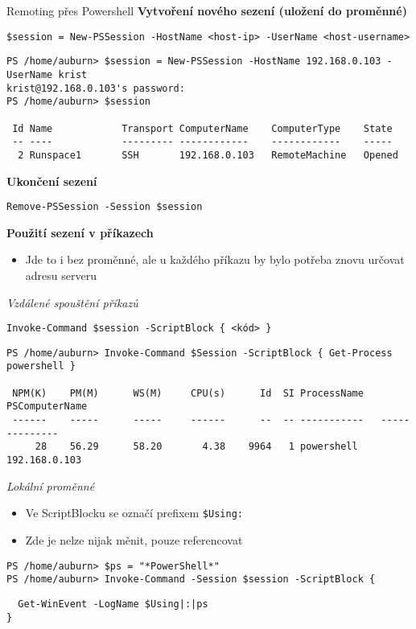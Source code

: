 \documentclass[main.tex]{subfiles}
\begin{document}
\begin{frame}{Remoting přes Powershell}
  \textbf{Vytvoření nového sezení (uložení do proměnné)}
\begin{verbatim}
$session = New-PSSession -HostName <host-ip> -UserName <host-username>
\end{verbatim}
\begin{verbatim}
PS /home/auburn> $session = New-PSSession -HostName 192.168.0.103 -UserName krist
krist@192.168.0.103's password:
PS /home/auburn> $session

 Id Name            Transport ComputerName    ComputerType    State
 -- ----            --------- ------------    ------------    -----
  2 Runspace1       SSH       192.168.0.103   RemoteMachine   Opened
\end{verbatim}
\textbf{Ukončení sezení}
\begin{verbatim}
Remove-PSSession -Session $session
\end{verbatim}
\textbf{Použití sezení v příkazech}
\begin{itemize}
  \item Jde to i bez proměnné, ale u každého příkazu by bylo potřeba znovu určovat adresu serveru
\end{itemize}
\framebreak
\textit{Vzdálené spouštění příkazů}
\begin{verbatim}
Invoke-Command $session -ScriptBlock { <kód> }
\end{verbatim}
\begin{verbatim}
PS /home/auburn> Invoke-Command $Session -ScriptBlock { Get-Process powershell }

 NPM(K)    PM(M)      WS(M)     CPU(s)      Id  SI ProcessName   PSComputerName
 ------    -----      -----     ------      --  -- -----------   --------------
     28    56.29      58.20       4.38    9964   1 powershell     192.168.0.103
\end{verbatim}
\textit{Lokální proměnné}
\begin{itemize}
  \item Ve ScriptBlocku se označí prefixem \texttt{\$Using:}
  \item Zde je nelze nijak měnit, pouze referencovat
\end{itemize}
\begin{verbatim}
PS /home/auburn> $ps = "*PowerShell*"
PS /home/auburn> Invoke-Command -Session $session -ScriptBlock {
\end{verbatim}
\vspace{-13mm}
\begin{verbatim}
  Get-WinEvent -LogName $Using|:|ps
}
\end{verbatim}


\end{frame}
\end{document}

